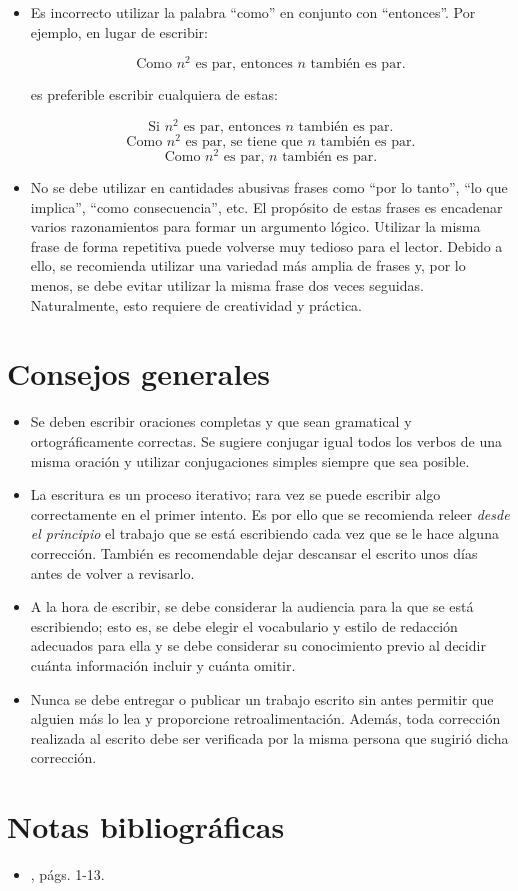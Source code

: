 \begin{itemize}
    \item Es incorrecto utilizar la palabra ``como'' en conjunto con ``entonces''.
    Por ejemplo, en lugar de escribir:
    
    \[
        \text{Como }n^{2}\text{ es par, entonces }n\text{ también es par.}
    \]
    
    es preferible escribir cualquiera de estas:

    \[
        \text{Si }n^{2}\text{ es par, entonces }n\text{ también es par.}
    \]
    \[
        \text{Como }n^{2}\text{ es par, se tiene que }n\text{ también es par.}
    \]
    \[
        \text{Como }n^{2}\text{ es par, }n\text{ también es par.}
    \]
    
    \item No se debe utilizar en cantidades abusivas frases como ``por lo tanto'',
    ``lo que implica'', ``como consecuencia'', etc. El propósito de
    estas frases es encadenar varios razonamientos para formar un
    argumento lógico. Utilizar la misma frase de forma repetitiva
    puede volverse muy tedioso para el lector. Debido a ello, se recomienda 
    utilizar una variedad más amplia de frases y, por lo menos, se debe evitar 
    utilizar la misma frase dos veces seguidas. Naturalmente, esto requiere de 
    creatividad y práctica.

\end{itemize}

\section{Consejos generales}

\begin{itemize}
    \item Se deben escribir oraciones completas y que sean gramatical y ortográficamente
    correctas. Se sugiere conjugar igual todos los verbos de una misma oración y utilizar
    conjugaciones simples siempre que sea posible. 
    \item La escritura es un proceso iterativo; rara vez se puede escribir algo
    correctamente en el primer intento. Es por ello que se recomienda
    releer \emph{desde el principio} el trabajo que se está escribiendo
    cada vez que se le hace alguna corrección. También es recomendable
    dejar descansar el escrito unos días antes de volver a revisarlo. 
    \item A la hora de escribir, se debe considerar la audiencia para la que
    se está escribiendo; esto es, se debe elegir el vocabulario y estilo
    de redacción adecuados para ella y se debe considerar su conocimiento
    previo al decidir cuánta información incluir y cuánta omitir. 
    \item Nunca se debe entregar o publicar un trabajo escrito sin antes permitir
    que alguien más lo lea y proporcione retroalimentación. Además, toda
    corrección realizada al escrito debe ser verificada por la misma persona
    que sugirió dicha corrección.
\end{itemize}

\section*{Notas bibliográficas}

\begin{itemize}
    \item \textcite{chartrand_mathematical_2012}, págs. 1-13.
\end{itemize}
